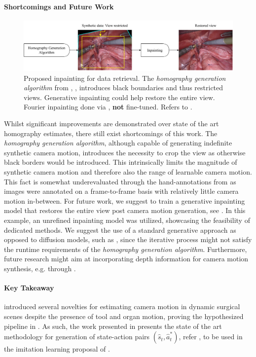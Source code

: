 \paragraph{Shortcomings and Future Work}
\begin{figure}[tb]
    \centering
    \includegraphics[width=\textwidth]{conclusion/fig/fourier_inpainting.pdf}
    \caption{Proposed inpainting for data retrieval. The \textit{homography generation algorithm} from , , introduces black boundaries and thus restricted views. Generative inpainting could help restore the entire view. Fourier inpainting done via \cite{suvorov2021resolution}, \textbf{not} fine-tuned. Refers to .}
    \label{con:fig:inpainting}
\end{figure}
Whilst significant improvements are demonstrated over state of the art homography estimates, there still exist shortcomings of this work. The \textit{homography generation algorithm}, although capable of generating indefinite synthetic camera motion, introduces the necessity to crop the view as otherwise black borders would be introduced. This intrinsically limits the magnitude of synthetic camera motion and therefore also the range of learnable camera motion. This fact is somewhat underevaluated through the hand-annotations from  as images were annotated on a frame-to-frame basis with relatively little camera motion in-between. For future work, we suggest to train a generative inpainting model that restores the entire view post camera motion generation, see . In this example, an unrefined inpainting model was utilized, showcasing the feasibility of dedicated methods. We suggest the use of a standard generative approach as opposed to diffusion models, such as \cite{rombach2022high}, since the iterative process might not satisfy the runtime requirements of the \textit{homography generation algorithm}. Furthermore, future research might aim at incorporating depth information for camera motion synthesis, e.g. through \cite{budd2024transferring}.

\paragraph{Key Takeaway}  introduced several novelties for estimating camera motion in dynamic surgical scenes despite the presence of tool and organ motion, proving the hypothesized pipeline in . As such, the work presented in \cite{huber2022deep} presents the state of the art methodology for generation of state-action pairs $(\hat{s}_t, \hat{a}^*_t)$, refer , to be used in the imitation learning proposal of .

